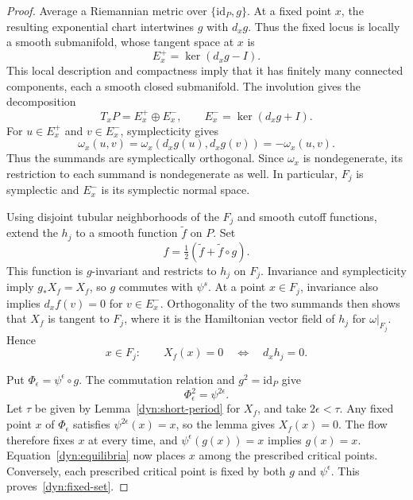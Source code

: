 \begin{proof}
Average a Riemannian metric over $\{\mathrm{id}_P,g\}$.  At a fixed
point $x$, the resulting exponential chart intertwines $g$ with
$d_xg$.  Thus the fixed locus is locally a smooth submanifold,
whose tangent space at $x$ is
\[
  E_x^+=\ker(d_xg-I).
\]
This local description and compactness imply that it has finitely
many connected components, each a smooth closed submanifold.
The involution gives the
decomposition
\[
  T_xP=E_x^+\oplus E_x^- ,
  \qquad E_x^-=\ker(d_xg+I).
\]
For $u\in E_x^+$ and $v\in E_x^-$, symplecticity gives
\[
  \omega_x(u,v)
  =\omega_x(d_xg(u),d_xg(v))=-\omega_x(u,v).
\]
Thus the summands are symplectically orthogonal.  Since $\omega_x$
is nondegenerate, its restriction to each summand is nondegenerate
as well.  In particular, $F_j$ is symplectic and $E_x^-$ is its
symplectic normal space.

Using disjoint tubular neighborhoods of the $F_j$ and smooth cutoff
functions, extend the $h_j$ to a smooth function $\widetilde f$ on $P$.
Set
\[
  f=\tfrac12(\widetilde f+\widetilde f\circ g).
\]
This function is $g$-invariant and restricts to $h_j$ on $F_j$.
Invariance and symplecticity imply $g_*X_f=X_f$, so $g$ commutes with
$\psi^s$.  At a point $x\in F_j$, invariance also implies
$d_xf(v)=0$ for $v\in E_x^-$.  Orthogonality of the two summands then
shows that $X_f$ is tangent to $F_j$, where it is the Hamiltonian
vector field of $h_j$ for $\omega|_{F_j}$.  Hence
\begin{equation}
\label{dyn:equilibria}
  x\in F_j:\qquad X_f(x)=0
  \quad\Longleftrightarrow\quad d_xh_j=0.
\end{equation}

Put $\Phi_\epsilon=\psi^\epsilon\circ g$.  The commutation relation
and $g^2=\mathrm{id}_P$ give
\[
  \Phi_\epsilon^2=\psi^{2\epsilon}.
\]
Let $\tau$ be given by Lemma~\ref{dyn:short-period} for $X_f$, and
take $2\epsilon<\tau$.  Any fixed point $x$ of $\Phi_\epsilon$
satisfies $\psi^{2\epsilon}(x)=x$, so the lemma gives $X_f(x)=0$.
The flow therefore fixes $x$ at every time, and
$\psi^\epsilon(g(x))=x$ implies $g(x)=x$.  Equation~\eqref{dyn:equilibria}
now places $x$ among the prescribed critical points.  Conversely,
each prescribed critical point is fixed by both $g$ and $\psi^\epsilon$.
This proves~\eqref{dyn:fixed-set}.


\end{proof}
